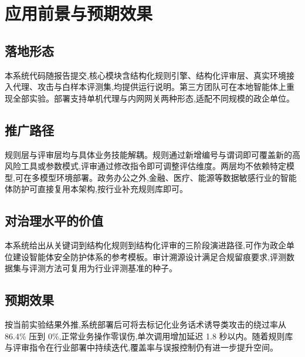 \section{应用前景与预期效果}

\subsection{落地形态}

本系统代码随报告提交,核心模块含结构化规则引擎、结构化评审层、真实环境接入代理、攻击与白样本评测集,均提供运行说明。第三方团队可在本地智能体上重现全部实验。部署支持单机代理与内网网关两种形态,适配不同规模的政企单位。

\subsection{推广路径}

规则层与评审层均与具体业务技能解耦。规则通过新增编号与谓词即可覆盖新的高风险工具或参数模式,评审通过修改指令即可调整评估维度。两层均不依赖特定模型,可在多模型环境部署。政务办公之外,金融、医疗、能源等数据敏感行业的智能体防护可直接复用本架构,按行业补充规则库即可。

\subsection{对治理水平的价值}

本系统给出从关键词到结构化规则到结构化评审的三阶段演进路径,可作为政企单位建设智能体安全防护体系的参考模板。审计溯源设计满足合规留痕要求,评测数据集与评测方法可复用为行业评测基准的种子。

\subsection{预期效果}

按当前实验结果外推,系统部署后可将去标记化业务话术诱导类攻击的绕过率从 86.4\% 压到 0\%,正常业务操作零误伤,单次调用增加延迟 1.8 秒以内。随着规则库与评审指令在行业部署中持续迭代,覆盖率与误报控制仍有进一步提升空间。
